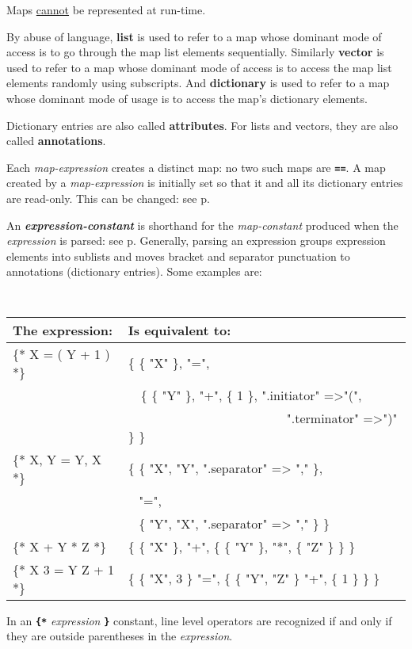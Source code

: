 \documentclass[12pt]{article}
\newcommand{\TT}[1]{{\tt \bfseries #1}}
\newcommand{\key}[1]{{\rm \bfseries #1}}
\newcommand{\emkey}[1]{{\em \bfseries #1}}
\newcommand{\skey}[2]{{\rm \bfseries #1#2}}
\newcommand{\pagref}[1]{p\pageref{#1}}
\begin{document}
Maps \underline{cannot} be represented at run-time.

By abuse of language, \key{list} is used to refer to a map whose
dominant mode of access is to go through the map list elements
sequentially.  Similarly \key{vector} is used to refer to a map whose
dominant mode of access is to access the map list elements randomly
using subscripts.  And \key{dictionary} is used to refer to a map
whose dominant mode of usage is to access the map's dictionary elements.

Dictionary entries are also called \skey{attribute}s.  For lists and
vectors, they are also called \skey{annotation}s.

Each {\em map-expression}
creates a distinct map: no two such maps are \TT{==}.  A map created
by a {\em map-expression} is initially set so that it and all its dictionary
entries are read-only.  This can be changed: see \pagref{READ-ONLY-MAP}.

An \emkey{expression-constant}\label{EXPRESSION-CONSTANT}
is shorthand for the {\em map-constant}
produced when the {\em expression} is parsed: see \pagref{PARSER-OUTPUT}.
Generally, parsing an expression groups expression elements into
sublists and moves bracket and separator punctuation to annotations
(dictionary entries).  Some examples are:
\begin{center} \tt
\begin{tabular}{l@{~~~}l}
\rm The expression:	& \rm Is equivalent to:
\\\hline
\{* X = ( Y + 1 ) *\}	& \{ \{ "X" \}, "=", \\
			&  ~~\{ \{ "Y" \}, "+", \{ 1 \}, ".initiator" =>"(", \\
			& ~~~~~~~~~~~~~~~~~~~~~~~~~".terminator" =>")" \} \}
\\[0.5ex]
\{* X, Y = Y, X *\}	& \{ \{ "X", "Y", ".separator" => "," \}, \\
			&  ~ "=", \\
			&  ~ \{ "Y", "X", ".separator" => "," \} \}
\\[0.5ex]
\{* X + Y * Z *\}	& \{ \{ "X" \}, "+", \{ \{ "Y" \}, "*", \{ "Z" \} \} \}
\\[0.5ex]
\{* X 3 = Y Z + 1 *\}	& \{ \{ "X", 3 \} "=",
                             \{ \{ "Y", "Z" \} "+", \{ 1 \} \} \}
\end{tabular}
\end{center}
In an \TT{\{*} {\em expression} \TT{*\}} constant,
line level operators are recognized if and only if
they are outside parentheses in the {\em expression}.
\end{document}
